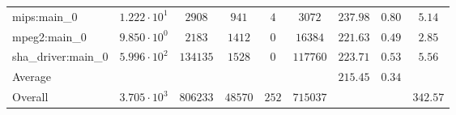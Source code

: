 \begin{tabular}{|l|c|c|c|c|c|c|c|c|}
mips:main\_0            & $ 1.222 \cdot 10^{1}  $ & $ 2908   $ & $ 941   $ & $ 4   $ & $ 3072   $ & $ 237.98      $ & $ 0.80    $ & $ 5.14    $ \\
mpeg2:main\_0           & $ 9.850 \cdot 10^{0}  $ & $ 2183   $ & $ 1412  $ & $ 0   $ & $ 16384  $ & $ 221.63      $ & $ 0.49    $ & $ 2.85    $ \\
sha\_driver:main\_0     & $ 5.996 \cdot 10^{2}  $ & $ 134135 $ & $ 1528  $ & $ 0   $ & $ 117760 $ & $ 223.71      $ & $ 0.53    $ & $ 5.56    $ \\
\hline
Average                 & $                     $ & $        $ & $       $ & $     $ & $        $ & $ 215.45      $ & $ 0.34    $ & $         $ \\
\hline
Overall                 & $ 3.705 \cdot 10^{3}  $ & $ 806233 $ & $ 48570 $ & $ 252 $ & $ 715037 $ & $             $ & $         $ & $ 342.57  $ \\
\hline
\end{tabular}
